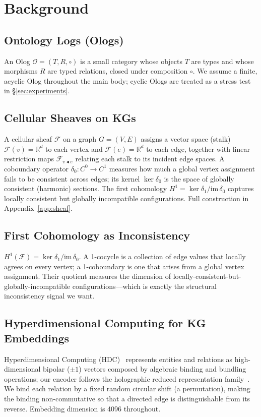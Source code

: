 \section{Background}
\label{sec:background}

\subsection{Ontology Logs (Ologs)}
An Olog $\mathcal{O} = (T, R, \circ)$ is a small category whose objects $T$
are types and whose morphisms $R$ are typed relations, closed under
composition $\circ$. We assume a finite, acyclic Olog throughout the main
body; cyclic Ologs are treated as a stress test in
\S\ref{sec:experiments}.

\subsection{Cellular Sheaves on KGs}
A cellular sheaf $\mathcal{F}$ on a graph $G = (V, E)$ assigns a vector
space (stalk) $\mathcal{F}(v) = \mathbb{R}^d$ to each vertex and
$\mathcal{F}(e) = \mathbb{R}^d$ to each edge, together with linear
restriction maps $\mathcal{F}_{v \blacktriangleleft e}$ relating each
stalk to its incident edge spaces. A coboundary operator
$\delta_0: C^0 \to C^1$ measures how much a global vertex assignment
fails to be consistent across edges; its kernel $\ker \delta_0$ is the
space of globally consistent (harmonic) sections. The first cohomology
$H^1 = \ker \delta_1 / \mathrm{im}\,\delta_0$ captures locally
consistent but globally incompatible configurations. Full construction
in Appendix~\ref{app:sheaf}.

\subsection{First Cohomology as Inconsistency}
$H^1(\mathcal{F}) = \ker \delta_1 / \mathrm{im}\,\delta_0$. A 1-cocycle is a
collection of edge values that locally agrees on every vertex; a
1-coboundary is one that arises from a global vertex assignment. Their
quotient measures the dimension of locally-consistent-but-globally-incompatible
configurations---which is exactly the structural inconsistency signal we
want.

\subsection{Hyperdimensional Computing for KG Embeddings}
Hyperdimensional Computing (HDC)~\cite{kanerva2009hdc} represents entities
and relations as high-dimensional bipolar ($\pm 1$) vectors composed by
algebraic binding and bundling operations; our encoder follows the
holographic reduced representation family~\cite{plate1995hrr}. We bind
each relation by a fixed random circular shift (a permutation), making the
binding non-commutative so that a directed edge is distinguishable from
its reverse. Embedding dimension is 4096 throughout.

